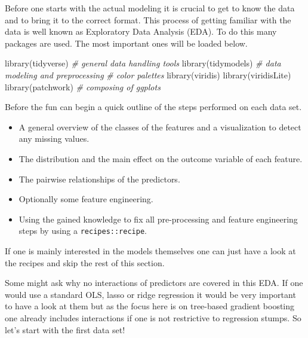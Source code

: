 \documentclass[
]{book}
\newenvironment{Shaded}{\begin{snugshade}}{\end{snugshade}}
\newcommand{\CommentTok}[1]{\textcolor[rgb]{0.56,0.35,0.01}{\textit{#1}}}
\newcommand{\FunctionTok}[1]{\textcolor[rgb]{0.00,0.00,0.00}{#1}}
\newcommand{\NormalTok}[1]{#1}
\providecommand{\tightlist}{%
  \setlength{\itemsep}{0pt}\setlength{\parskip}{0pt}}
\begin{document}
Before one starts with the actual modeling it is crucial to get to know the data and to bring it to the correct format. This process of getting familiar with the data is well known as Exploratory Data Analysis (EDA). To do this many packages are used.\citetext{\citealp{tidyverse}; \citealp{tidymodels}; \citealp{viridis}; \citealp{ggtext}; \citealp[ ]{viridisLite}; \citealp{patchwork}; \citealp{visdat}; \citealp{lubridate}; \citealp{latexplots}; \citealp{ggally}} The most important ones will be loaded below.

\begin{Shaded}
\begin{Highlighting}[]
\FunctionTok{library}\NormalTok{(tidyverse) }\CommentTok{\# general data handling tools}
\FunctionTok{library}\NormalTok{(tidymodels) }\CommentTok{\# data modeling and preprocessing}
\CommentTok{\# color palettes}
\FunctionTok{library}\NormalTok{(viridis)}
\FunctionTok{library}\NormalTok{(viridisLite)}
\FunctionTok{library}\NormalTok{(patchwork) }\CommentTok{\# composing of ggplots}
\end{Highlighting}
\end{Shaded}

Before the fun can begin a quick outline of the steps performed on each data set.

\begin{itemize}
\tightlist
\item
  A general overview of the classes of the features and a visualization to detect any missing values.
\item
  The distribution and the main effect on the outcome variable of each feature.
\item
  The pairwise relationships of the predictors.
\item
  Optionally some feature engineering.
\item
  Using the gained knowledge to fix all pre-processing and feature engineering steps by using a \texttt{recipes::recipe}.
\end{itemize}

If one is mainly interested in the models themselves one can just have a look at the recipes and skip the rest of this section.

Some might ask why no interactions of predictors are covered in this EDA. If one would use a standard OLS, lasso or ridge regression it would be very important to have a look at them but as the focus here is on tree-based gradient boosting one already includes interactions if one is not restrictive to regression stumps. So let's start with the first data set!
\end{document}
